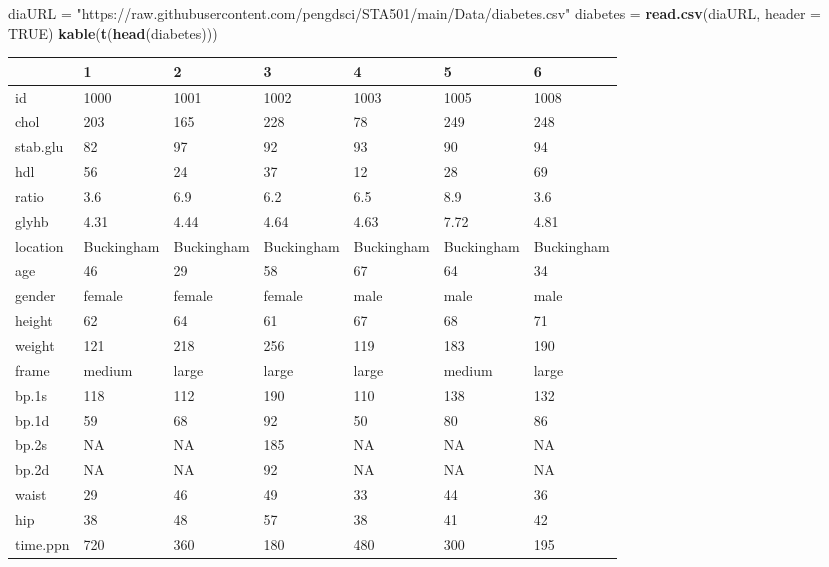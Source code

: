 \documentclass[
]{book}
\newenvironment{Shaded}{\begin{snugshade}}{\end{snugshade}}
\newcommand{\AttributeTok}[1]{\textcolor[rgb]{0.13,0.29,0.53}{#1}}
\newcommand{\ConstantTok}[1]{\textcolor[rgb]{0.56,0.35,0.01}{#1}}
\newcommand{\FunctionTok}[1]{\textcolor[rgb]{0.13,0.29,0.53}{\textbf{#1}}}
\newcommand{\NormalTok}[1]{#1}
\newcommand{\OtherTok}[1]{\textcolor[rgb]{0.56,0.35,0.01}{#1}}
\newcommand{\StringTok}[1]{\textcolor[rgb]{0.31,0.60,0.02}{#1}}
\begin{document}
\begin{Shaded}
\begin{Highlighting}[]
\NormalTok{diaURL }\OtherTok{=} \StringTok{"https://raw.githubusercontent.com/pengdsci/STA501/main/Data/diabetes.csv"}
\NormalTok{diabetes }\OtherTok{=} \FunctionTok{read.csv}\NormalTok{(diaURL, }\AttributeTok{header =} \ConstantTok{TRUE}\NormalTok{)}
\FunctionTok{kable}\NormalTok{(}\FunctionTok{t}\NormalTok{(}\FunctionTok{head}\NormalTok{(diabetes)))}
\end{Highlighting}
\end{Shaded}

\begin{tabular}{l|l|l|l|l|l|l}
\hline
  & 1 & 2 & 3 & 4 & 5 & 6\\
\hline
id & 1000 & 1001 & 1002 & 1003 & 1005 & 1008\\
\hline
chol & 203 & 165 & 228 & 78 & 249 & 248\\
\hline
stab.glu & 82 & 97 & 92 & 93 & 90 & 94\\
\hline
hdl & 56 & 24 & 37 & 12 & 28 & 69\\
\hline
ratio & 3.6 & 6.9 & 6.2 & 6.5 & 8.9 & 3.6\\
\hline
glyhb & 4.31 & 4.44 & 4.64 & 4.63 & 7.72 & 4.81\\
\hline
location & Buckingham & Buckingham & Buckingham & Buckingham & Buckingham & Buckingham\\
\hline
age & 46 & 29 & 58 & 67 & 64 & 34\\
\hline
gender & female & female & female & male & male & male\\
\hline
height & 62 & 64 & 61 & 67 & 68 & 71\\
\hline
weight & 121 & 218 & 256 & 119 & 183 & 190\\
\hline
frame & medium & large & large & large & medium & large\\
\hline
bp.1s & 118 & 112 & 190 & 110 & 138 & 132\\
\hline
bp.1d & 59 & 68 & 92 & 50 & 80 & 86\\
\hline
bp.2s & NA & NA & 185 & NA & NA & NA\\
\hline
bp.2d & NA & NA & 92 & NA & NA & NA\\
\hline
waist & 29 & 46 & 49 & 33 & 44 & 36\\
\hline
hip & 38 & 48 & 57 & 38 & 41 & 42\\
\hline
time.ppn & 720 & 360 & 180 & 480 & 300 & 195\\
\hline
\end{tabular}
\end{document}
